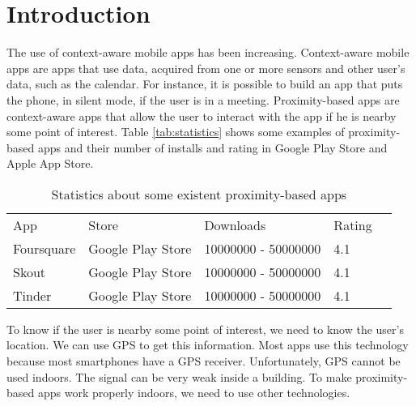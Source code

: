 
%
%

\section{Introduction}
\label{sec:introduction}


The use of context-aware mobile apps has been increasing.
Context-aware mobile apps are apps that use data, acquired
from one or more sensors and other user's data, 
such as the calendar. For instance, it is possible to
build an app that puts the phone, in silent mode, if the
user is in a meeting. Proximity-based apps are
context-aware apps that allow the user to interact
with the app if he is nearby some point of interest.
Table \ref{tab:statistics} shows some examples of proximity-based
apps and their number of installs and rating in Google
Play Store and Apple App Store. 
\begin{table}[h]
\label{tab:statistics}
\centering
\begin{tabular}{|l|l|l|l|l}
\cline{1-4}
App & Store & Downloads & \multicolumn{1}{c|}{Rating} &  \\ \cline{1-4}
Foursquare & Google Play Store & \num{10000000} - \num{50000000} & 4.1 &  \\ \cline{1-4}
Skout & Google Play Store & \num{10000000} - \num{50000000} & 4.1 &  \\ \cline{1-4}
Tinder & Google Play Store & \num{10000000} - \num{50000000} & 4.1 &  \\ \hline
\end{tabular}
\caption{Statistics about some existent proximity-based apps}
\label{my-label}
\end{table}

To know if the user is nearby some point of interest,
we need to know the user's location. We can use GPS to
get this information. Most apps use this technology because
most smartphones have a GPS receiver. 
Unfortunately, GPS cannot be used indoors. The signal can
be very weak inside a building. To make proximity-based
apps work properly indoors, we need to use other 
technologies.
